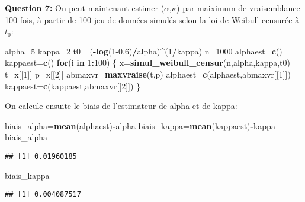 \documentclass[
]{article}
\newenvironment{Shaded}{\begin{snugshade}}{\end{snugshade}}
\newcommand{\ControlFlowTok}[1]{\textcolor[rgb]{0.13,0.29,0.53}{\textbf{#1}}}
\newcommand{\DecValTok}[1]{\textcolor[rgb]{0.00,0.00,0.81}{#1}}
\newcommand{\FloatTok}[1]{\textcolor[rgb]{0.00,0.00,0.81}{#1}}
\newcommand{\KeywordTok}[1]{\textcolor[rgb]{0.13,0.29,0.53}{\textbf{#1}}}
\newcommand{\NormalTok}[1]{#1}
\newcommand{\OperatorTok}[1]{\textcolor[rgb]{0.81,0.36,0.00}{\textbf{#1}}}
\newcommand{\StringTok}[1]{\textcolor[rgb]{0.31,0.60,0.02}{#1}}
\begin{document}
\textbf{Question 7:} On peut maintenant estimer (\(\alpha\),\(\kappa\))
par maiximum de vraisemblance 100 fois, à partir de 100 jeu de données
simulés selon la loi de Weibull censurée à \(t_0\):

\begin{Shaded}
\begin{Highlighting}[]
\NormalTok{alpha=}\DecValTok{5}
\NormalTok{kappa=}\DecValTok{2}
\NormalTok{t0=}\StringTok{ }\NormalTok{(}\OperatorTok{-}\KeywordTok{log}\NormalTok{(}\DecValTok{1}\FloatTok{-0.6}\NormalTok{)}\OperatorTok{/}\NormalTok{alpha)}\OperatorTok{^}\NormalTok{(}\DecValTok{1}\OperatorTok{/}\NormalTok{kappa)}
\NormalTok{n=}\DecValTok{1000}
\NormalTok{alphaest=}\KeywordTok{c}\NormalTok{()}
\NormalTok{kappaest=}\KeywordTok{c}\NormalTok{()}
\ControlFlowTok{for}\NormalTok{(i }\ControlFlowTok{in} \DecValTok{1}\OperatorTok{:}\DecValTok{100}\NormalTok{)}
\NormalTok{\{}
\NormalTok{  x=}\KeywordTok{simul_weibull_censur}\NormalTok{(n,alpha,kappa,t0)}
\NormalTok{  t=x[[}\DecValTok{1}\NormalTok{]]}
\NormalTok{  p=x[[}\DecValTok{2}\NormalTok{]]}
\NormalTok{  abmaxvr=}\KeywordTok{maxvraise}\NormalTok{(t,p)}
\NormalTok{  alphaest=}\KeywordTok{c}\NormalTok{(alphaest,abmaxvr[[}\DecValTok{1}\NormalTok{]])}
\NormalTok{  kappaest=}\KeywordTok{c}\NormalTok{(kappaest,abmaxvr[[}\DecValTok{2}\NormalTok{]])}
\NormalTok{\}}
\end{Highlighting}
\end{Shaded}

On calcule ensuite le biais de l'estimateur de alpha et de kappa:

\begin{Shaded}
\begin{Highlighting}[]
\NormalTok{biais_alpha=}\KeywordTok{mean}\NormalTok{(alphaest)}\OperatorTok{-}\NormalTok{alpha}
\NormalTok{biais_kappa=}\KeywordTok{mean}\NormalTok{(kappaest)}\OperatorTok{-}\NormalTok{kappa}
\NormalTok{biais_alpha}
\end{Highlighting}
\end{Shaded}

\begin{verbatim}
## [1] 0.01960185
\end{verbatim}

\begin{Shaded}
\begin{Highlighting}[]
\NormalTok{biais_kappa}
\end{Highlighting}
\end{Shaded}

\begin{verbatim}
## [1] 0.004087517
\end{verbatim}
\end{document}

